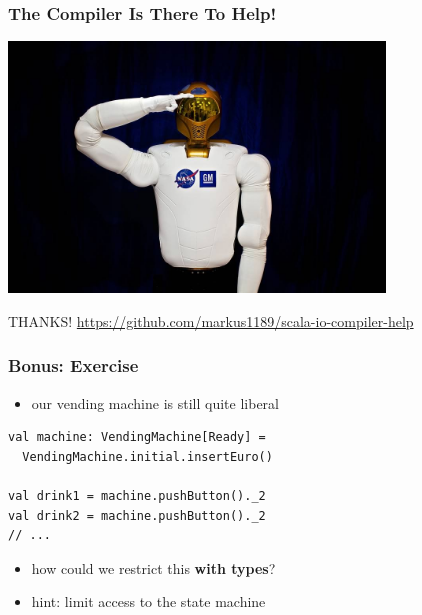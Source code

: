 \documentclass{beamer}
\begin{document}
\begin{frame}
  \frametitle{The Compiler Is There To Help!}
  \begin{center}
    \includegraphics[width=0.75\textwidth]{../pics/robot.jpg}
  \end{center}
  \vfill
  \begin{center}
    {\Huge THANKS!}
    \href{https://github.com/markus1189/scala-io-compiler-help}{https://github.com/markus1189/scala-io-compiler-help}
  \end{center}
\end{frame}

\begin{frame}[fragile]
  \frametitle{Bonus: Exercise}
  \begin{itemize}
  \item our vending machine is still quite liberal
  \end{itemize}

\begin{verbatim}
val machine: VendingMachine[Ready] = 
  VendingMachine.initial.insertEuro()

val drink1 = machine.pushButton()._2
val drink2 = machine.pushButton()._2
// ...
\end{verbatim}
    \begin{itemize}
    \item how could we restrict this \textbf{with types}?
    \item hint: limit access to the state machine
  \end{itemize}
\end{frame}
\end{document}
